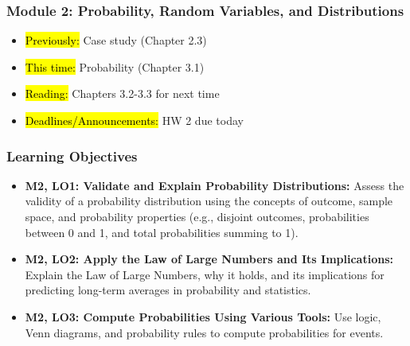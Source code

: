 
\begin{frame}
    \frametitle{Module 2: Probability, Random Variables, and Distributions}
    \begin{itemize}
        \item \hl{Previously: } Case study (Chapter 2.3)
        \item \hl{This time: } Probability (Chapter 3.1)
        \item \hl{Reading: } Chapters 3.2-3.3 for next time
        \item \hl{Deadlines/Announcements: } HW 2 due today
    \end{itemize}
    
\end{frame}

\begin{frame}
    \frametitle{Learning Objectives}
    \begin{itemize}
        \item \textbf{M2, LO1: Validate and Explain Probability Distributions:} Assess the validity of a probability distribution using the concepts of outcome, sample space, and probability properties (e.g., disjoint outcomes, probabilities between 0 and 1, and total probabilities summing to 1).
        \item \textbf{M2, LO2: Apply the Law of Large Numbers and Its Implications:} Explain the Law of Large Numbers, why it holds, and its implications for predicting long-term averages in probability and statistics.
        \item \textbf{M2, LO3: Compute Probabilities Using Various Tools:} Use logic, Venn diagrams, and probability rules to compute probabilities for events.
    \end{itemize}
\end{frame}
